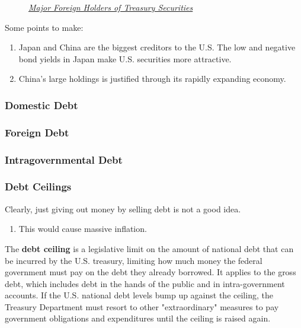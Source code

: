\documentclass{article}
\begin{document}
    \begin{figure}[H]
      \centering 
      \caption{\href{https://ticdata.treasury.gov/Publish/mfh.txt}{\textit{Major Foreign Holders of Treasury Securities}}} 
      \label{fig:foreign_debt_holders}
    \end{figure}

    Some points to make:
    \begin{enumerate}
      \item Japan and China are the biggest creditors to the U.S. The low and negative bond yields in Japan make U.S. securities more attractive.
      \item China's large holdings is justified through its rapidly expanding economy.
    \end{enumerate}

    \subsubsection{Domestic Debt}

    \subsubsection{Foreign Debt}

    \subsubsection{Intragovernmental Debt}

    \subsubsection{Debt Ceilings}

      Clearly, just giving out money by selling debt is not a good idea. 
      \begin{enumerate}
        \item This would cause massive inflation. 
      \end{enumerate}

      \begin{definition}
        \label{def:debt-ceiling}
        The \textbf{debt ceiling} is a legislative limit on the amount of national debt that can be incurred by the U.S. treasury, limiting how much money the federal government must pay on the debt they already borrowed. It applies to the gross debt, which includes debt in the hands of the public and in intra-government accounts. If the U.S. national debt levels bump up against the ceiling, the Treasury Department must resort to other "extraordinary" measures to pay government obligations and expenditures until the ceiling is raised again.
      \end{definition}
\end{document}
